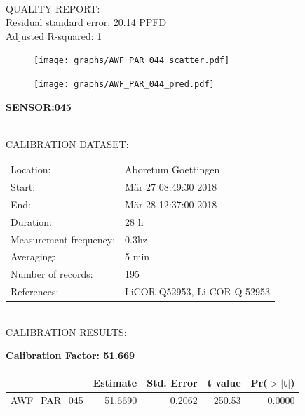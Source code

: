 \documentclass[oneside]{report}
\begin{document}
\hrulefill\\
QUALITY REPORT:\\
Residual standard error: 20.14 PPFD\\
Adjusted R-squared: 1



\begin{figure}[H]
  \centering
  \texttt{[image: graphs/AWF\_PAR\_044\_scatter.pdf]}
\end{figure}




\begin{figure}[H]
  \centering
  \texttt{[image: graphs/AWF\_PAR\_044\_pred.pdf]}
\end{figure}

\pagebreak


\begin{center}
\large{\textbf{SENSOR:045}}\\
\end{center}

\hrulefill\\
CALIBRATION DATASET:\\
\begin{table}[h!]
  \centering
  \label{tab:table1}
  \begin{tabular}{ll}
    Location: & Aboretum Goettingen\\ 
    
    
    Start:  & Mär 27 08:49:30 2018 \\
    End:   & Mär 28 12:37:00 2018\\ 
    Duration: & 28 h\\
    Measurement frequency: & 0.3hz\\
    Averaging:  &5 min\\
    Number of records: & 195 \\
    References: & LiCOR Q52953, Li-COR Q 52953 \\
  \end{tabular}
\end{table}

\hrulefill\\
CALIBRATION RESULTS:\\


\begin{center}
\textbf{\large{Calibration Factor: 51.669}}\\
\end{center}
\begin{table}[ht]
\centering
\begin{tabular}{rrrrr}
  \hline
 & Estimate & Std. Error & t value & Pr($>$$|$t$|$) \\ 
  \hline
AWF\_PAR\_045 & 51.6690 & 0.2062 & 250.53 & 0.0000 \\ 
   \hline
\end{tabular}
\end{table}
\end{document}

